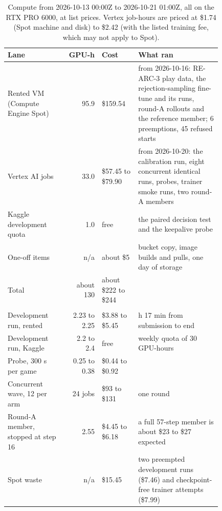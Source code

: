\begin{table}[!htb]
\caption{Compute from 2026-10-13 00:00Z to 2026-10-21 01:00Z, all on the RTX PRO 6000, at list prices. Vertex job-hours are priced at \$1.74 (Spot machine and disk) to \$2.42 (with the listed training fee, which may not apply to Spot).}\label{tab:compute} %
\centering\footnotesize
\setlength{\tabcolsep}{3pt}\renewcommand{\arraystretch}{0.9}
\begin{tabular}{@{}>{\raggedright\arraybackslash}p{0.27\linewidth}r>{\raggedright\arraybackslash}p{0.17\linewidth}>{\raggedright\arraybackslash}p{0.39\linewidth}@{}}
\toprule
Lane & GPU-h & Cost & What ran \\
\midrule
Rented VM (Compute Engine Spot) & 95.9 & \$159.54 & from 2026-10-16: RE-ARC-3 play data, the rejection-sampling fine-tune and its runs, round-A rollouts and the reference member; 6 preemptions, 45 refused starts \\ %
Vertex AI jobs & 33.0 & \$57.45 to \$79.90 & from 2026-10-20: the calibration run, eight concurrent identical runs, probes, trainer smoke runs, two round-A members \\ %
Kaggle development quota & 1.0 & free & the paired decision test and the keepalive probe \\ %
One-off items & n/a & about \$5 & bucket copy, image builds and pulls, one day of storage \\ %
Total & about 130 & about \$222 to \$244 & \\ %
\midrule
\multicolumn{4}{@{}l}{\textit{Unit costs (list prices)}} \\
Development run, rented & 2.23 to 2.25 & \$3.88 to \$5.45 & 2 h 17 min from submission to end \\ %
Development run, Kaggle & 2.2 to 2.4 & free & weekly quota of 30 GPU-hours \\ %
Probe, 300 s per game & 0.25 to 0.38 & \$0.44 to \$0.92 & \\ %
Concurrent wave, 12 per arm & 24 jobs & \$93 to \$131 & one round \\ %
Round-A member, stopped at step 16 & 2.55 & \$4.45 to \$6.18 & a full 57-step member is about \$23 to \$27 expected \\ %
Spot waste & n/a & \$15.45 & two preempted development runs (\$7.46) and checkpoint-free trainer attempts (\$7.99) \\ %
\bottomrule
\end{tabular}
\end{table}

